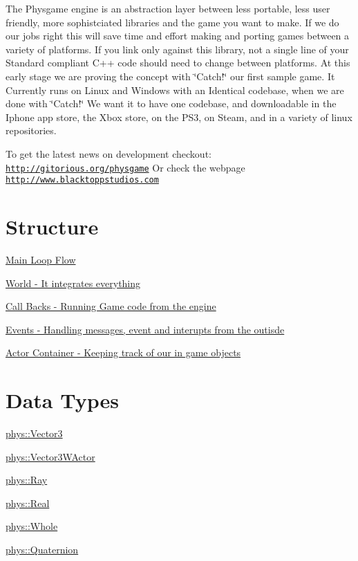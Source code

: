 The Physgame engine is an abstraction layer between less portable, less user friendly, more sophistciated libraries and the game you want to make. If we do our jobs right this will save time and effort making and porting games between a variety of platforms. If you link only against this library, not a single line of your Standard compliant C++ code should need to change between platforms. At this early stage we are proving the concept with \char`\"{}Catch!\char`\"{} our first sample game. It Currently runs on Linux and Windows with an Identical codebase, when we are done with \char`\"{}Catch!\char`\"{} We want it to have one codebase, and downloadable in the Iphone app store, the Xbox store, on the PS3, on Steam, and in a variety of linux repositories.

To get the latest news on development checkout: \href{http://gitorious.org/physgame}{\tt http://gitorious.org/physgame} Or check the webpage \href{http://www.blacktoppstudios.com}{\tt http://www.blacktoppstudios.com}\hypertarget{index_Engine}{}\section{Structure}\label{index_Engine}
\hyperlink{mainloop1}{Main Loop Flow}

\hyperlink{classphys_1_1World}{World -\/ It integrates everything}

\hyperlink{classphys_1_1CallBackManager}{Call Backs -\/ Running Game code from the engine}

\hyperlink{classphys_1_1EventManager}{Events -\/ Handling messages, event and interupts from the outisde}

\hyperlink{actorcontainer1}{Actor Container -\/ Keeping track of our in game objects}\hypertarget{index_Types}{}\section{Data Types}\label{index_Types}
\hyperlink{classphys_1_1Vector3}{phys::Vector3}

\hyperlink{classphys_1_1Vector3WActor}{phys::Vector3WActor}

\hyperlink{classphys_1_1Ray}{phys::Ray}

\hyperlink{namespacephys_af7eb897198d265b8e868f45240230d5f}{phys::Real}

\hyperlink{namespacephys_a460f6bc24c8dd347b05e0366ae34f34a}{phys::Whole}

\hyperlink{classphys_1_1Quaternion}{phys::Quaternion}

